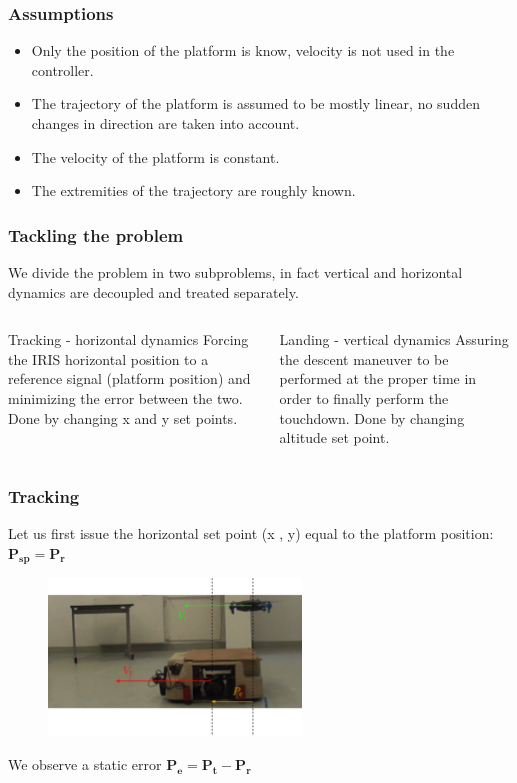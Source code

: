 \documentclass[xcolor=dvipsnames]{beamer}
\begin{document}
\begin{frame}
\frametitle{Assumptions}
\begin{itemize}
\item Only the position of the platform is know, velocity is not used in the controller.
\item The trajectory of the platform is assumed to be mostly linear, no sudden changes in direction are taken into account.
\item The velocity of the platform is constant.
\item The extremities of the trajectory are roughly known.
\end{itemize}
\end{frame}

\begin{frame}
\frametitle{Tackling the problem}
We divide the problem in two subproblems, in fact vertical and horizontal dynamics are decoupled and treated separately.
\begin{columns}[t]
\begin{block}{Tracking - horizontal dynamics}
Forcing the IRIS horizontal position to a reference signal (platform position) and minimizing the error between the two. Done by changing x and y set points.
\end{block}
\begin{block}{Landing - vertical dynamics}
Assuring the descent maneuver to be performed at the proper time in order to finally perform the touchdown. Done by changing altitude set point.
\end{block}
\end{columns}
\end{frame}

\begin{frame}
\frametitle{Tracking}
Let us first issue the horizontal set point (x , y) equal to the platform position: $\boldsymbol{P_{sp }} = \boldsymbol{P_{r}}$
\begin{figure}
\includegraphics[width = 0.6\textwidth]{f/tracknogain2.eps}
\end{figure}

We observe a static error $\boldsymbol{P_e} = \boldsymbol{P_{t}} - \boldsymbol{P_{r}}$
\end{frame}
\end{document}
